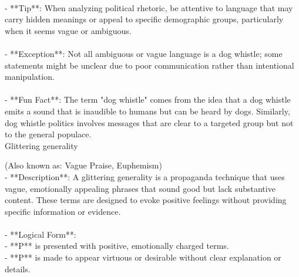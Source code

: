 \documentclass[a4paper,12pt,single,pdftex]{scrartcl}
\begin{document}
    
      
    \\

    
      - **Tip**: When analyzing political rhetoric, be attentive to language that may carry hidden meanings or appeal to specific demographic groups, particularly when it seems vague or ambiguous.
    \\

    
      
    \\

    
      - **Exception**: Not all ambiguous or vague language is a dog whistle; some statements might be unclear due to poor communication rather than intentional manipulation.
    \\

    
      
    \\

    
      - **Fun Fact**: The term "dog whistle" comes from the idea that a dog whistle emits a sound that is inaudible to humans but can be heard by dogs. Similarly, dog whistle politics involves messages that are clear to a targeted group but not to the general populace.
    \\

  

Glittering generality
    
      (Also known as: Vague Praise, Euphemism)
    \\

  
    
      - **Description**: A glittering generality is a propaganda technique that uses vague, emotionally appealing phrases that sound good but lack substantive content. These terms are designed to evoke positive feelings without providing specific information or evidence.
    \\

    
      
    \\

    
      - **Logical Form**:
    \\

    
        - **P** is presented with positive, emotionally charged terms.
    \\

    
        - **P** is made to appear virtuous or desirable without clear explanation or details.
    \\
\end{document}
